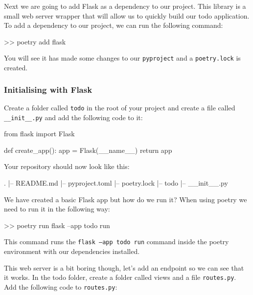 \documentclass{csse4400}
\begin{document}

Next we are going to add Flask as a dependency to our project. This library is a small web server wrapper that will allow us to quickly build our todo application. To add a dependency to our project, we can run the following command:

\begin{code}[language=bash,numbers=none]{}
  >> poetry add flask
\end{code}

You will see it has made some changes to our \texttt{pyproject} and a \texttt{poetry.lock} is created.

\subsubsection{Initialising with Flask}

Create a folder called  \texttt{todo} in the root of your project and create a file called \texttt{\_\_init\_\_.py} and add the following code to it:

\begin{code}[language=python]{}
  from flask import Flask

  def create_app():
      app = Flask(__name__)
      return app
\end{code}

Your repository should now look like this:

\begin{code}[language=bash,numbers=none]{}
  .
  |-- README.md
  |-- pyproject.toml
  |-- poetry.lock
  |-- todo
      |-- __init__.py
\end{code}

We have created a basic Flask app but how do we run it?
When using poetry we need to run it in the following way:

\begin{code}[language=bash,numbers=none]{}
  >> poetry run flask --app todo run
\end{code}

This command runs the \texttt{flask --app todo run} command inside the poetry environment with our dependencies installed.

This web server is a bit boring though, let's add an endpoint so we can see that it works. In the todo folder, create a folder called views and a file \texttt{routes.py}. Add the following code to  \texttt{routes.py}:
\end{document}
